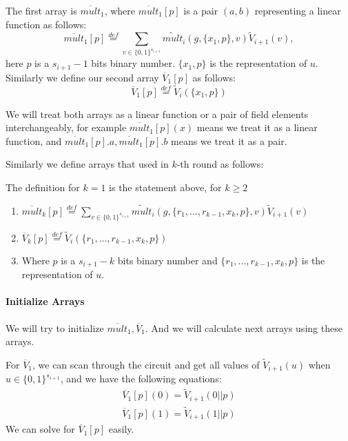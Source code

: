 The first array is $\overline{mult}_1$, where $\overline{mult}_1[p]$ is a pair $(a, b)$ representing a linear function as follows:
$$\overline{mult}_1[p]\overset{def}{=}\sum_{v\in \{0,1\}^{s_{i+1}}}\tilde{mult}_i(g, \{x_1, p\}, v)\tilde{V}_{i+1}(v),$$
here $p$ is a $s_{i+1}-1$ bits binary number. $\{x_1, p\}$ is the representation of $u$. Similarly we define our second array $\overline{V}_1[p]$ as follows:
$$\overline{V}_1[p]\overset{def}{=}\tilde{V}_i(\{x_1, p\})$$

We will treat both arrays as a linear function or a pair of field elements interchangeably, for example $\overline{mult}_1[p](x)$ means we treat it as a linear function, and $\overline{mult}_1[p].a, \overline{mult}_1[p].b$ means we treat it as a pair.

Similarly we define arrays that used in $k$-th round as follows:
\begin{definition}

	The definition for $k=1$ is the statement above, for $k\ge 2$
	\begin{enumerate}
		\item $\overline{mult}_k[p]\overset{def}{=}\sum_{v\in \{0, 1\}^{s_{i+1}}}\tilde{mult}_i(g, \{r_1, ..., r_{k-1}, x_k, p\}, v)\tilde{V}_{i+1}(v)$
		\item $\overline{V}_k[p]\overset{def}{=}\tilde{V}_i(\{r_1, ..., r_{k-1}, x_k, p\})$
		\item Where $p$ is a $s_{i+1}-k$ bits binary number and $\{r_1, ..., r_{k-1}, x_k, p\}$ is the representation of $u$.
	\end{enumerate}
\end{definition}

\paragraph{Initialize Arrays}
We will try to initialize $\overline{mult}_1, \overline{V}_1$. And we will calculate next arrays using these arrays.

For $\overline{V}_1$, we can scan through the circuit and get all values of $\tilde{V}_{i+1}(u)$ when $u \in \{0, 1\}^{s_{i+1}}$, and we have the following equations:
\begin{align*}
\overline{V}_1[p](0)=\tilde{V}_{i+1}(0||p)\\
\overline{V}_1[p](1)=\tilde{V}_{i+1}(1||p)
\end{align*}
We can solve for $\overline{V}_1[p]$ easily.

